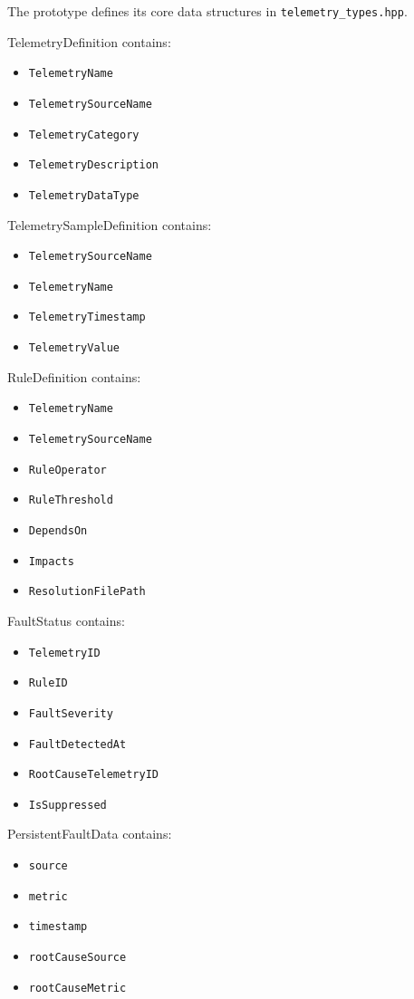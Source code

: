 The prototype defines its core data structures in \texttt{telemetry\_types.hpp}.

TelemetryDefinition contains:
\begin{itemize}
\item \texttt{TelemetryName}
\item \texttt{TelemetrySourceName}
\item \texttt{TelemetryCategory}
\item \texttt{TelemetryDescription}
\item \texttt{TelemetryDataType}
\end{itemize}

TelemetrySampleDefinition contains:
\begin{itemize}
\item \texttt{TelemetrySourceName}
\item \texttt{TelemetryName}
\item \texttt{TelemetryTimestamp}
\item \texttt{TelemetryValue}
\end{itemize}

RuleDefinition contains:
\begin{itemize}
\item \texttt{TelemetryName}
\item \texttt{TelemetrySourceName}
\item \texttt{RuleOperator}
\item \texttt{RuleThreshold}
\item \texttt{DependsOn}
\item \texttt{Impacts}
\item \texttt{ResolutionFilePath}
\end{itemize}

FaultStatus contains:
\begin{itemize}
\item \texttt{TelemetryID}
\item \texttt{RuleID}
\item \texttt{FaultSeverity}
\item \texttt{FaultDetectedAt}
\item \texttt{RootCauseTelemetryID}
\item \texttt{IsSuppressed}
\end{itemize}

PersistentFaultData contains:
\begin{itemize}
\item \texttt{source}
\item \texttt{metric}
\item \texttt{timestamp}
\item \texttt{rootCauseSource}
\item \texttt{rootCauseMetric}
\end{itemize}

